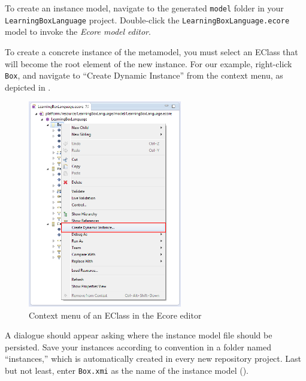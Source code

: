 \begin{stepbystep}

\item To create an instance model, navigate to the generated \texttt{model} folder in your \texttt{LearningBoxLanguage} project.
Double-click the \texttt{LearningBoxLa\-nguage.ecore} model to invoke  the \emph{Ecore model editor}. 

\vspace{0.5cm}

\item To create a concrete instance of the metamodel, you must select an EClass that will become the root element of the new instance.
For our example, right-click \texttt{Box}, and navigate to ``Create Dynamic Instance'' from the context menu, as depicted in .

\begin{figure}[htbp]
	\centering
  \includegraphics[width=0.6\textwidth]{../../org.moflon.doc.handbook.02_leitnersLearningBox/3_creatingInstance/04_images/eclipse_createDynamicInstance}
	\caption{Context menu of an EClass in the Ecore editor}
	\label{fig:context_menu}
\end{figure}

\vspace{0.5cm}

\item A dialogue should appear asking where the instance model file should be persisted. Save your instances according to convention in a
folder named ``instances,'' which is automatically created in every new repository project. Last but not least, enter \texttt{Box.xmi} as the name of the
instance model ().


\end{stepbystep}
